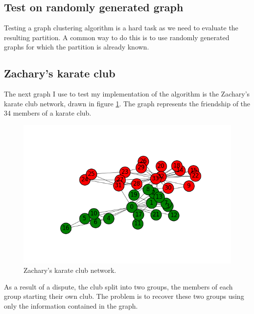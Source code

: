 \documentclass[12pt]{article}
\theoremstyle{definition}
\begin{document}
\subsection{Test on randomly generated graph}
Testing a graph clustering algorithm is a hard task as we need to evaluate the resulting partition. A common way to do this is to use randomly generated graphs for which the partition is already known.

\subsection{Zachary's karate club \cite{zachary1977information}}
The next graph I use to test my implementation of the algorithm is the Zachary's karate club network, drawn in figure \ref{fig_karate_graph}. The graph represents the friendship of the 34 members of a karate club. 

\begin{figure}[h]
	\includegraphics[scale=0.5]{karate_graph}
	\centering
	\caption{Zachary's karate club network.}
	\label{fig_karate_graph}
\end{figure}

As a result of a dispute, the club split into two groups, the members of each group starting their own club. The problem is to recover these two groups using only the information contained in the graph. 
\end{document}
